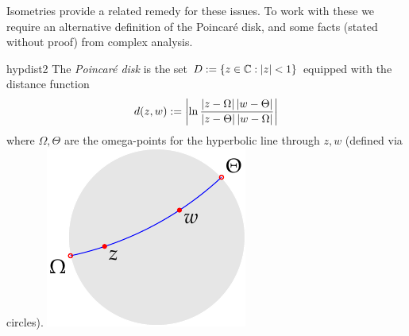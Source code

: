 



Isometries provide a related remedy for these issues. To work with these we require an alternative definition of the Poincaré disk, and some facts (stated without proof) from complex analysis.

\begin{defn}[lower separated=false, sidebyside, sidebyside align=top seam, sidebyside gap=0pt, righthand width=0.3\linewidth]{}{hypdist2}
The \emph{Poincaré disk} is the set $D:=\{z\in\mathbb{C}:\left| z\right|<1\}$ equipped with the distance function
\[d(z,w):=\left| \ln\frac{\left| z-\Omega\right|\left| w-\Theta\right|}{\left| z-\Theta\right|\left| w-\Omega\right|}\right|\]
where $\Omega,\Theta$ are the omega-points for the hyperbolic line through $z,w$ (defined via circles).
\tcblower
\flushright\includegraphics{isom-dist}
\end{defn}

